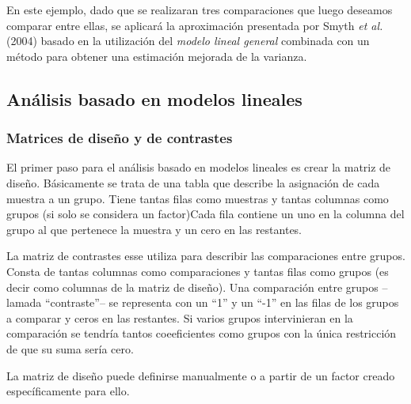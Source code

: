 \documentclass[a4paper]{article}\usepackage[]{graphicx}\usepackage[]{color}
\begin{document}
En este ejemplo, dado que se realizaran tres comparaciones que luego deseamos comparar entre ellas, se aplicará la aproximación presentada por Smyth \emph{et al.} (2004) basado 
en la utilización del \emph{modelo lineal general} combinada con un método 
para obtener una estimación mejorada de la varianza. 

\subsection{Análisis basado en modelos lineales}


\subsubsection{Matrices de diseño y de contrastes}

El primer paso para el análisis basado en modelos lineales es crear la matriz de diseño.
Básicamente se trata de una tabla que describe la asignación de cada muestra a un grupo. Tiene tantas filas como muestras y tantas columnas como grupos (si solo se considera un factor)Cada fila contiene un uno en la columna del grupo al que pertenece la muestra y un cero en las restantes.

La matriz de contrastes esse utiliza para describir las comparaciones entre grupos. Consta de tantas columnas como comparaciones y tantas filas como grupos (es decir como columnas de la matriz de diseño). Una comparación entre grupos --lamada ``contraste''-- se representa con un ``1'' y un ``-1'' en las filas de los grupos a comparar y ceros en las restantes. Si varios grupos intervinieran en la comparación se tendría tantos coeeficientes como grupos con la única restricción de que su suma sería cero. 

La matriz de diseño puede definirse manualmente o a partir de un factor 
creado específicamente para ello.
\end{document}
